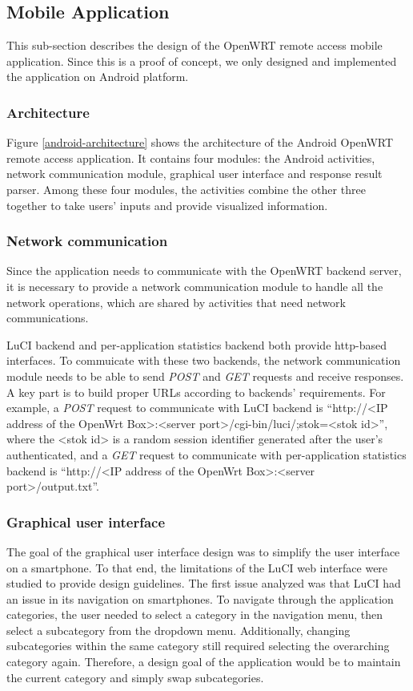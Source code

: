 \subsection{Mobile Application}
This sub-section describes the design of the OpenWRT remote access mobile application. Since this is a proof of concept, we only designed and implemented the application on Android platform.

\subsubsection{Architecture}
Figure \ref{android-architecture} shows the architecture of the Android OpenWRT remote access application. It contains four modules: the Android activities, network communication module, graphical user interface and response result parser. Among these four modules, the activities combine the other three together to take users' inputs and provide visualized information.

\subsubsection{Network communication}
Since the application needs to communicate with the OpenWRT backend server, it is necessary to provide a network communication module to handle all the network operations, which are shared by activities that need network communications.

LuCI backend and per-application statistics backend both provide http-based interfaces. To commuicate with these two backends, the network communication module needs to be able to send \textit{POST} and \textit{GET} requests and receive responses. A key part is to build proper URLs according to backends' requirements. For example, a \textit{POST} request to communicate with LuCI backend is ``http://<IP address of the OpenWrt Box>:<server port>/cgi-bin/luci/;stok=<stok id>'', where the <stok id> is a random session identifier generated after the user's authenticated, and a \textit{GET} request to communicate with per-application statistics backend is ``http://<IP address of the OpenWrt Box>:<server port>/output.txt''.

\subsubsection{Graphical user interface}
The goal of the graphical user interface design was to simplify the user interface on a smartphone. To that end, the limitations of the LuCI web interface were studied to provide design guidelines. The first issue analyzed was that LuCI had an issue in its navigation on smartphones. To navigate through the application categories, the user needed to select a category in the navigation menu, then select a subcategory from the dropdown menu. Additionally, changing subcategories within the same category still required selecting the overarching category again. Therefore, a design goal of the application would be to maintain the current category and simply swap subcategories.
	
